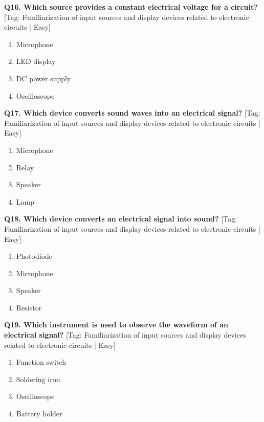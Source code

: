 \noindent\textbf{Q16. Which source provides a constant electrical voltage for a circuit?} \hfill [Tag: Familiarization of input sources and display devices related to electronic circuits | Easy]
\begin{enumerate}[label=(\alph*),topsep=2pt,itemsep=1pt,partopsep=0pt,parsep=0pt]
    \item {Microphone}
    \item {LED display}
    \item {DC power supply}
    \item {Oscilloscope}
\end{enumerate}
\vspace{2mm}

\noindent\textbf{Q17. Which device converts sound waves into an electrical signal?} \hfill [Tag: Familiarization of input sources and display devices related to electronic circuits | Easy]
\begin{enumerate}[label=(\alph*),topsep=2pt,itemsep=1pt,partopsep=0pt,parsep=0pt]
    \item {Microphone}
    \item {Relay}
    \item {Speaker}
    \item {Lamp}
\end{enumerate}
\vspace{2mm}

\noindent\textbf{Q18. Which device converts an electrical signal into sound?} \hfill [Tag: Familiarization of input sources and display devices related to electronic circuits | Easy]
\begin{enumerate}[label=(\alph*),topsep=2pt,itemsep=1pt,partopsep=0pt,parsep=0pt]
    \item {Photodiode}
    \item {Microphone}
    \item {Speaker}
    \item {Resistor}
\end{enumerate}
\vspace{2mm}

\noindent\textbf{Q19. Which instrument is used to observe the waveform of an electrical signal?} \hfill [Tag: Familiarization of input sources and display devices related to electronic circuits | Easy]
\begin{enumerate}[label=(\alph*),topsep=2pt,itemsep=1pt,partopsep=0pt,parsep=0pt]
    \item {Function switch}
    \item {Soldering iron}
    \item {Oscilloscope}
    \item {Battery holder}
\end{enumerate}
\vspace{2mm}

